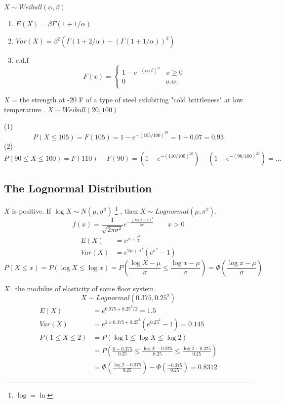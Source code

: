 \begin{prop}
 $X \sim Weibull(\alpha,\beta)$
\begin{enumerate}
\item $E(X)=\beta \Gamma(1+1/\alpha)$
\item $Var(X)=\beta^2\left(\Gamma(1+2/\alpha)-(\Gamma(1+1/\alpha))^2\right)$
\item c.d.f
\[F(x)=\begin{cases}
1-e^{-(\alpha/\beta)^{\alpha}} & x \geq 0 \\
0	&o.w. \\
\end{cases}\]
\end{enumerate}
\end{prop}

\begin{exmp}
$X$ = the strength at  -20 F of a type of steel exhibiting "cold brittleness" at low temperature . $X \sim Weibull(20,100)$

(1) 
\[P(X \leq 105)=F(105)=1-e^{-(105/100)^{20}}=1-0.07=\boxed{0.93}\]
(2)
\[P(90 \leq X \leq 100)=F(110)-F(90)=\left(1-e^{-(110/100)^{20}}\right)-\left(1-e^{-(90/100)^{20}}\right)=\boxed{\dots}\] 
\end{exmp}

\subsection{The Lognormal Distribution}
$X$ is positive. If $\log{X} \sim N(\mu,\sigma^2)$ \footnote{$\log=\ln$} , then $X \sim Lognormal(\mu,\sigma^2)$.
\[f(x)=\frac{1}{\sqrt{2 \pi \sigma^2}} e^{-\frac{(\log{x}-\mu)^2}{2 \sigma^2}}   \qquad  x>0\]
\begin{align*}
E(X)&=e^{\mu +\frac{\sigma^2}{2}} \\
Var(X)&=e^{2\mu +\sigma^2} (e^{\sigma^2}-1)
\end{align*}
\[P(X \leq x)=P(\log{X}\leq \log{x})= P \left(\frac{\log{X}-\mu}{\sigma} \leq \frac{\log{x}-\mu}{\sigma} \right)  =\Phi \left(\frac{\log{x}-\mu}{\sigma} \right)\]

\begin{exmp}
$X$=the modulus of elasticity of some floor system.
\[X \sim Lognormal(0.375,0.25^2)\]
\begin{align*}
E(X)&=e^{0.375+0.25^{2}/2}=1.5\\
Var(X)&= e^{2\times0.375+0.25^{2}}\left(e^{0.25^{2}}-1\right)=0.145\\
P(1 \leq X \leq 2)&=P(\log{1} \leq \log{X}\leq \log{2})\\
&= P \left(\frac{0-0.375}{0.25} \leq \frac{\log{X}-0.375}{0.25} \leq \frac{\log{2}-0.375}{0.25} \right) \\
& =\Phi \left(\frac{\log{2}-0.375}{0.25} \right)-\Phi \left(\frac{-0.375}{0.25} \right)=\boxed{0.8312}
\end{align*}


\end{exmp}

